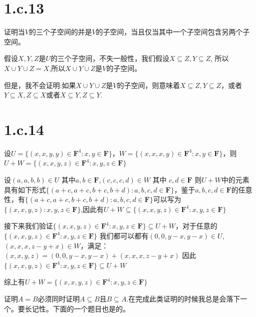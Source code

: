 \documentclass[10pt,a4paper,UTF8]{article}
\begin{document}
\section*{1.c.13}
\label{sec:orgfaf273a}


\begin{problem}
证明当\(V\)的三个子空间的并是\(V\)的子空间，当且仅当其中一个子空间包含另两个子空间。
\end{problem}

\begin{answer}
假设\(X,Y,Z\)是\(U\)的三个子空间，不失一般性，我们假设\(X\subseteq Z, Y\subseteq Z\), 所以\(X\cup Y \cup Z = X\),所以\(X\cup Y\cup Z\)是\(V\)的子空间。

但是，我不会证明:如果\(X\cup Y\cup Z\)是\(V\)的子空间，则意味着\(X\subseteq Z,Y\subseteq Z\)，或者\(Y\subseteq X,Z\subseteq X\)或者\(X\subseteq Y, Z\subseteq Y\).
\end{answer}
\section*{1.c.14}
\label{sec:org94c509f}

\begin{problem}
设\(U=\{(x,x,y,y)\in \mathbf{F}^{4}:x,y\in \mathbf{F}\}\)，\(W = \{(x,x,x,y)\in \mathbf{F}^{4}:x,y\in \mathbf{F}\}\)，则\(U+W = \{(x,x,y,z)\in \mathbf{F}^{4}:x,y,z\in \mathbf{F}\}\)
\end{problem}

\begin{answer}
设\((a,a,b,b)\in U\) 其中\(a,b\in \mathbf{F}\),\((c,c,c,d)\in W\) 其中 \(c,d \in \mathbf{F}\)
则\(U+W\)中的元素具有如下形式\(\{(a+c,a+c,b+c,b+d):a,b,c,d\in \mathbf{F}\}\)，鉴于\(a,b,c,d \in \mathbf{F}\)的任意性，有\(\{(a+c,a+c,b+c,b+d):a,b,c,d\in \mathbf{F}\}\)可以写为\(\{(x,x,y,z):x,y,z\in \mathbf{F}\}\),因此有\(U+W\subseteq \{(x,x,y,z)\in \mathbf{F}^{4}:x,y,z\in \mathbf{F}\}\)

接下来我们验证\(\{(x,x,y,z)\in \mathbf{F}^{4}:x,y,z\in \mathbf{F}\} \subseteq U+W\)，对于任意的\(\{(x,x,y,z)\in \mathbf{F}^{4}:x,y,z\in \mathbf{F}\}\) 我们都可以都有\((0,0,y-x,y-x)\in U\),\((x,x,x,z-y+x)\in W\)，满足：\((x,x,y,z) = (0,0,y-x,y-x) + (x,x,x,z-y+x)\) 因此\(\{(x,x,y,z)\in \mathbf{F}^{4}:x,y,z\in \mathbf{F}\} \subseteq U+W\)

综上有\(U+W =\{(x,x,y,z)\in \mathbf{F}^{4}:x,y,z\in \mathbf{F}\}\)

证明\(A=B\)必须同时证明\(A\subseteq B\)且\(B\subseteq A\).在完成此类证明的时候我总是会落下一个。要长记性。下面的一个题目也是的。
\end{answer}
\end{document}

